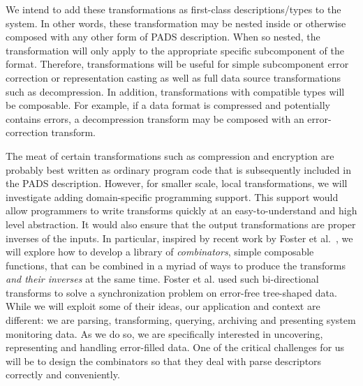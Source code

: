 We intend to add these transformations as first-class
descriptions/types to the system.  In other words, these
transformation may be nested inside or otherwise composed with any
other form of PADS description.  When so nested, the transformation
will only apply to the appropriate specific subcomponent of the
format.  Therefore, transformations will be useful for simple
subcomponent error correction or representation casting as well as
full data source transformations such as decompression.  In addition,
transformations with compatible types will be composable.  For
example, if a data format is compressed and potentially contains
errors, a decompression transform may be composed with an
error-correction transform.

The meat of certain transformations such as compression and encryption
are probably best written as ordinary program code that is
subsequently included in the PADS description.  However, for smaller
scale, local transformations, we will investigate adding domain-specific
programming support.  This support would allow programmers to write
transforms quickly at an easy-to-understand and high level
abstraction.  It would also ensure that the output transformations are
proper inverses of the inputs.  In particular, inspired by recent work
by Foster et al.~\cite{foster+:lens}, we will explore how to develop a
library of {\em combinators}, simple composable functions, that can be
combined in a myriad of ways to produce the transforms {\em and their
inverses} at the same time.  Foster et al. used such bi-directional transforms to
solve a synchronization problem on error-free tree-shaped data. 
While we will exploit some of their
ideas, our application and
context are different: we are parsing, transforming, querying, archiving
and presenting system monitoring data.
As we do so, we are specifically interested in uncovering,
representing and handling error-filled data.  One of the critical
challenges for us will be to design the combinators so that they deal
with \pads{} parse descriptors correctly
and conveniently.

